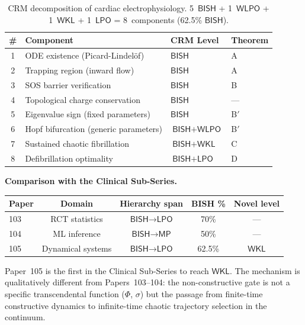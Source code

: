 \documentclass[11pt,a4paper]{article}
\theoremstyle{plain}
\theoremstyle{definition}
\newcommand{\BISH}{\textsf{BISH}}
\newcommand{\WKL}{\textsf{WKL}}
\newcommand{\WLPO}{\textsf{WLPO}}
\newcommand{\LPO}{\textsf{LPO}}
\newcommand{\MP}{\textsf{MP}}
\begin{document}
\begin{table}[h]
\centering
\begin{tabular}{clll}
\toprule
\textbf{\#} & \textbf{Component} & \textbf{CRM Level} & \textbf{Theorem} \\
\midrule
1 & ODE existence (Picard-Lindel\"of) & $\BISH$ & A \\
2 & Trapping region (inward flow) & $\BISH$ & A \\
3 & SOS barrier verification & $\BISH$ & B \\
4 & Topological charge conservation & $\BISH$ & --- \\
5 & Eigenvalue sign (fixed parameters) & $\BISH$ & B$'$ \\
6 & Hopf bifurcation (generic parameters) & $\BISH + \WLPO$ & B$'$ \\
7 & Sustained chaotic fibrillation & $\BISH + \WKL$ & C \\
8 & Defibrillation optimality & $\BISH + \LPO$ & D \\
\bottomrule
\end{tabular}
\caption{CRM decomposition of cardiac electrophysiology.  5~$\BISH$ + 1~$\WLPO$ + 1~$\WKL$ + 1~$\LPO$ = 8~components (62.5\% $\BISH$).}
\label{tab:audit}
\end{table}

\textbf{Comparison with the Clinical Sub-Series.}

\begin{center}
\begin{tabular}{lcccc}
\toprule
\textbf{Paper} & \textbf{Domain} & \textbf{Hierarchy span} & \textbf{BISH \%} & \textbf{Novel level} \\
\midrule
103 & RCT statistics & $\BISH \to \LPO$ & 70\% & --- \\
104 & ML inference & $\BISH \to \MP$ & 50\% & --- \\
105 & Dynamical systems & $\BISH \to \LPO$ & 62.5\% & $\WKL$ \\
\bottomrule
\end{tabular}
\end{center}

Paper~105 is the first in the Clinical Sub-Series to reach $\WKL$.  The mechanism is qualitatively different from Papers~103--104: the non-constructive gate is not a specific transcendental function ($\Phi$, $\sigma$) but the passage from finite-time constructive dynamics to infinite-time chaotic trajectory selection in the continuum.
\end{document}

